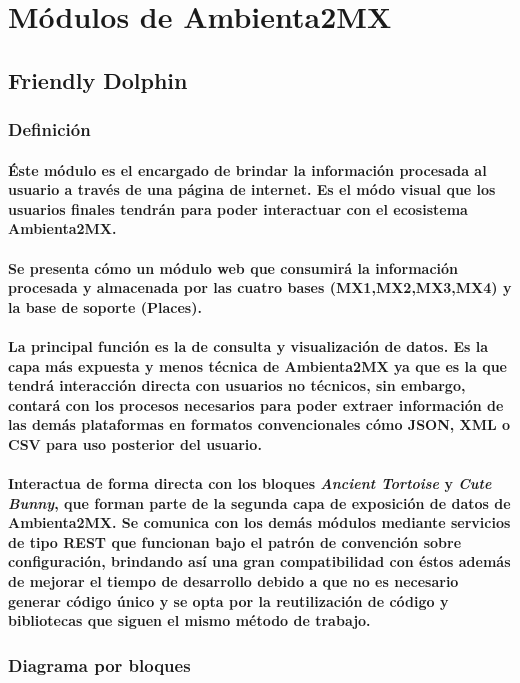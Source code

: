 \section{Módulos de Ambienta2MX}
  \subsection{Friendly Dolphin}
    \subsubsection{Definición}
      \paragraph{Éste módulo es el encargado de brindar la información procesada al usuario a través de una página de internet. Es el módo visual que los usuarios finales tendrán para poder interactuar con el ecosistema Ambienta2MX.}
      \paragraph{Se presenta cómo un módulo web que consumirá la información procesada y almacenada por las cuatro bases (MX1,MX2,MX3,MX4) y la base de soporte (Places).}
      \paragraph{La principal función es la de consulta y visualización de datos. Es la capa más expuesta y menos técnica de Ambienta2MX ya que es la que tendrá interacción directa con usuarios no técnicos, sin embargo, contará con los procesos necesarios para poder extraer información de las demás plataformas en formatos convencionales cómo JSON, XML o CSV para uso posterior del usuario.}
      \paragraph{Interactua de forma directa con los bloques \textbf{\emph{Ancient Tortoise}} y \textbf{\emph{Cute Bunny}}, que forman parte de la segunda capa de exposición de datos de Ambienta2MX. Se comunica con los demás módulos mediante servicios de tipo REST que funcionan bajo el patrón de convención sobre configuración\cite{8}, brindando así una gran compatibilidad con éstos además de mejorar el tiempo de desarrollo debido a que no es necesario generar código único y se opta por la reutilización de código y bibliotecas que siguen el mismo método de trabajo.}
  \subsubsection{Diagrama por bloques}
